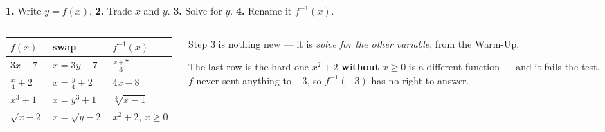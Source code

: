 \documentclass[aspectratio=169, 11pt]{beamer}
\begin{document}
\begin{frame}[t, plain]
  \begin{center}
    \textbf{1.} Write $y=f(x)$. \quad \textbf{2.} Trade $x$ and $y$. \quad
    \textbf{3.} Solve for $y$. \quad \textbf{4.} Rename it $f^{-1}(x)$.
  \end{center}
  \vspace{4pt}
  \begin{columns}[T]
    \begin{column}{0.54\textwidth}
      \footnotesize
      \begin{center}
      \renewcommand{\arraystretch}{1.45}
      \begin{tabular}{|l|l|l|}
      \hline
      $f(x)$ & \textbf{swap} & $f^{-1}(x)$ \\ \hline
      $3x-7$ & $x=3y-7$ & $\frac{x+7}{3}$ \\ \hline
      $\frac{x}{4}+2$ & $x=\frac{y}{4}+2$ & $4x-8$ \\ \hline
      $x^{3}+1$ & $x=y^{3}+1$ & $\sqrt[3]{x-1}$ \\ \hline
      $\sqrt{x-2}$ & $x=\sqrt{y-2}$ & $x^{2}+2$, \; $x\ge0$ \\ \hline
      \end{tabular}
      \end{center}
    \end{column}
    \begin{column}{0.42\textwidth}
      \footnotesize
      Step 3 is nothing new --- it is \emph{solve for the other variable}, from the Warm-Up.
      \vspace{5pt}
      \begin{block}{The last row is the hard one}
        $x^{2}+2$ \textbf{without} $x\ge0$ is a different function --- and it fails the test.
        \\[3pt]
        $f$ never sent anything to $-3$, so $f^{-1}(-3)$ has no right to answer.
      \end{block}
    \end{column}
  \end{columns}
\end{frame}
\end{document}
